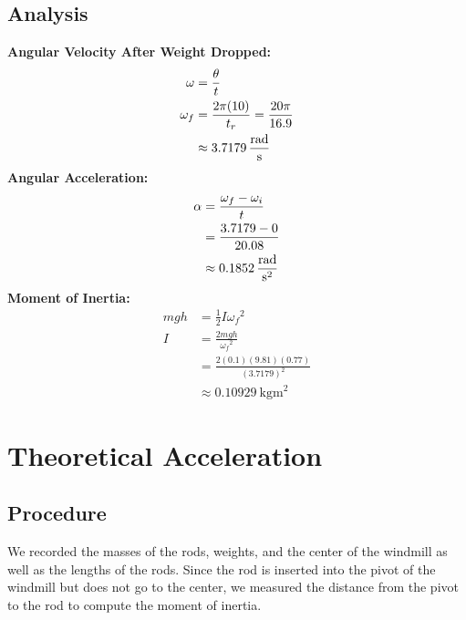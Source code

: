 \documentclass[article, 11pt]{article}
\begin{document}
    \subsection{Analysis}
    \textbf{Angular Velocity After Weight Dropped:}
    \begin{align*}
        \omega   &= \frac{\theta}{t}  \\
        \omega_f &= \frac{2\pi(10)}{t_r} = \frac{20\pi}{16.9} \\
                 &\approx \SI{3.7179}{\frac{\radian}{\second}}
    \end{align*}
    \textbf{Angular Acceleration:}
    \begin{align*}
        \alpha &= \frac{\omega_f - \omega_i}{t} \\
               &= \frac{3.7179 - 0}{20.08} \\
               &\approx \SI{0.1852}{\frac{\radian}{\second^2}}
    \end{align*}
    \textbf{Moment of Inertia:}
    \begin{align*}
        mgh &= \frac{1}{2}I{\omega_f}^2 \\
        I   &= \frac{2mgh}{{\omega_f}^2} \\
            &= \frac{2(0.1)(9.81)(0.77)}{(3.7179)^2} \\
            &\approx \SI{0.10929}{\kilogram\meter^2}
    \end{align*}

    \section{Theoretical Acceleration}
    \subsection{Procedure}
    \noindent
    We recorded the masses of the rods, weights, and the center of the windmill as well as the lengths of the rods. Since the rod is inserted into the pivot of the windmill but does not go to the center, we measured the distance from the pivot to the rod to compute the moment of inertia. 
\end{document}
